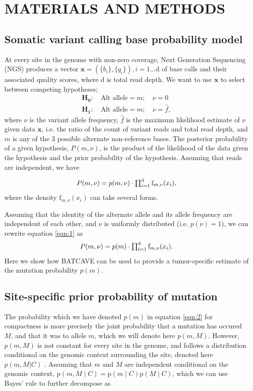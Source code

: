 \documentclass[a4,center,fleqn]{NAR}
\newcommand{\batcave}{BATCAVE }
\begin{document}
\section{MATERIALS AND METHODS}
\subsection{Somatic variant calling base probability model}

At every site in the genome with non-zero coverage, Next Generation Sequencing (NGS) produces a vector $\mathbf{x}  = (\{b_i\},\{q_i\}), i = 1\dots \mathrm{d}$ of base calls and their associated quality scores, where $\mathrm{d}$ is total read depth.
We want to use $\mathbf{x}$ to select between competing hypotheses;
$$
  \begin{array}{l}
    \mathbf{H_0}:\quad \textrm{Alt allele} = m;\quad\nu = 0\\
    \mathbf{H_1}:\quad \textrm{Alt allele} = m;\quad\nu = \hat{f},
  \end{array}
$$
where $\nu$ is the variant allele frequency, $\hat{f}$ is the maximum likelihood estimate of $\nu$ given data $\mathbf{x}$, i.e. the ratio of the count of variant reads and total read depth, and $m$ is any of the 3 possible alternate non-reference bases.
The posterior probability of a given hypothesis, $P(m,\nu)$, is the product of the likelihood of the data given the hypothesis and the prior probability of the hypothesis. 
Assuming that reads are independent, we have

\begin{equation}
  \label{eqn:1}
$$
  P(m,\nu) = p(m,\nu) \cdot \prod_{i=1}^{\mathrm{d}} \textrm{f}_{m,\nu}(x_i),
$$
\end{equation}
where the density $\textrm{f}_{m,\nu}(x_i)$ can take several forms.

Assuming that the identity of the alternate allele and its allele frequency are independent of each other, and $\nu$ is uniformly distributed (i.e. $p(\nu) = 1$), we can rewrite equation \ref{eqn:1} as
\begin{equation}
  \label{eqn:2}
$$
  P(m,\nu) = p(m) \cdot \prod_{i=1}^{\mathrm{d}} \textrm{f}_{m,\nu}(x_i).
$$
\end{equation}
Here we show how \batcave can be used to provide a tumor-specific estimate of the mutation probability $p(m)$.

\subsection{Site-specific prior probability of mutation}
The probability which we have denoted $p(m)$ in equation \ref{eqn:2} for compactness is more precisely the joint probability that a mutation has occured $M$, and that it was to allele $m$, which we will denote here $p(m,M)$.
However, $p(m,M)$ is not constant for every site in the genome, and follows a distribution conditional on the genomic context surrounding the site, denoted here $p(m,M | C)$ \cite{Buisson2019}.
Assuming that $m$ and $M$ are independent conditional on the genomic context, $\mathrm{p}(m,M \mid C) = \mathrm{p}(m \mid C) \mathrm{p}(M \mid C)$, which we can use Bayes' rule to further decompose as 
\end{document}
